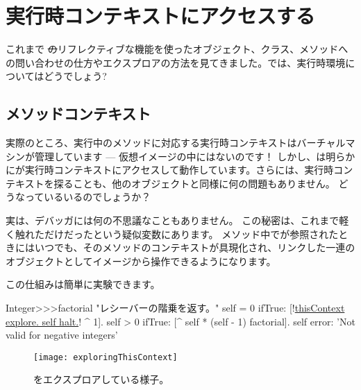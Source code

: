 \documentclass[a4paper,10pt,twoside]{book}
\begin{document}
\section{実行時コンテキストにアクセスする}

これまで \st のリフレクティブな機能を使ったオブジェクト、クラス、メソッドへの問い合わせの仕方やエクスプロアの方法を見てきました。では、実行時環境についてはどうでしょう?

\subsection{メソッドコンテキスト}

実際のところ、実行中のメソッドに対応する実行時コンテキストはバーチャルマシンが管理しています --- 仮想イメージの中にはないのです！
しかし、は明らかにが実行時コンテキストにアクセスして動作しています。さらには、実行時コンテキストを探ることも、他のオブジェクトと同様に何の問題もありません。
どうなっているいるのでしょうか？

実は、デバッガには何の不思議なこともありません。
この秘密は、これまで軽く触れただけだったという疑似変数にあります。
メソッド中でが参照されたときにはいつでも、そのメソッドのコンテキストが具現化され、リンクした一連のオブジェクトとしてイメージから操作できるようになります。

この仕組みは簡単に実験できます。


\begin{code}{}
Integer>>>factorial
	"レシーバーの階乗を返す。"
	self = 0 ifTrue: [!\underline{thisContext explore. self halt.}! ^ 1].
	self > 0 ifTrue: [^ self * (self - 1) factorial].
	self error: 'Not valid for negative integers'
\end{code}


\begin{figure}[ht]\centering
	\texttt{[image: exploringThisContext]}
	\caption{をエクスプロアしている様子。}
\end{figure}
\end{document}
